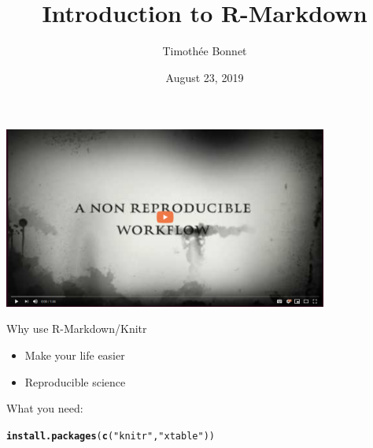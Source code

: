 \documentclass[10pt]{beamer}\usepackage[]{graphicx}\usepackage[]{color}
\title{Introduction to R-Markdown}
\author{Timoth\'ee Bonnet}
\institute{BDSI / RSB}
\date{August 23, 2019}
\makeatletter
\newcommand{\hlstr}[1]{\textcolor[rgb]{0.192,0.494,0.8}{#1}}%
\newcommand{\hlstd}[1]{\textcolor[rgb]{0.345,0.345,0.345}{#1}}%
\newcommand{\hlkwd}[1]{\textcolor[rgb]{0.737,0.353,0.396}{\textbf{#1}}}%
\newenvironment{kframe}{%
 \def\at@end@of@kframe{}%
 \ifinner\ifhmode%
  \def\at@end@of@kframe{\end{minipage}}%
  \begin{minipage}{\columnwidth}%
 \fi\fi%
 \def\FrameCommand##1{\hskip\@totalleftmargin \hskip-\fboxsep
 \colorbox{shadecolor}{##1}\hskip-\fboxsep
     \hskip-\linewidth \hskip-\@totalleftmargin \hskip\columnwidth}%
 \MakeFramed {\advance\hsize-\width
   \@totalleftmargin\z@ \linewidth\hsize
   \@setminipage}}%
 {\par\unskip\endMakeFramed%
 \at@end@of@kframe}
\newenvironment{knitrout}{}{} %
\makeatother
\begin{document}
\begin{frame}
\centering
\href{https://www.youtube.com/watch?v=s3JldKoA0zw}{\includegraphics[width=0.8\textwidth]{Figures/markdownyoutube.png}}

\end{frame}

\begin{frame}
\maketitle
\end{frame}

\begin{frame}{Why use R-Markdown/Knitr}
  \begin{itemize}
    \item Make your life easier
    \item Reproducible science
  \end{itemize}
\end{frame}


\begin{frame}{What you need:}

\begin{knitrout}\small
{}\color{fgcolor}\begin{kframe}
\begin{alltt}
\hlkwd{install.packages}\hlstd{(}\hlkwd{c}\hlstd{(}\hlstr{"knitr"}\hlstd{,} \hlstr{"xtable"}\hlstd{))}
\end{alltt}
\end{kframe}
\end{knitrout}

\end{frame}
\end{document}
